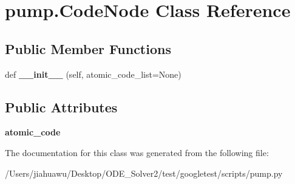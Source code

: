 \hypertarget{classpump_1_1_code_node}{}\section{pump.\+Code\+Node Class Reference}
\label{classpump_1_1_code_node}
\subsection*{Public Member Functions}
\begin{DoxyCompactItemize}
\item 
\mbox{\label{classpump_1_1_code_node_a2ca8a75324a64e48004812d6c0bc1cbd}} 
def {\bfseries \+\_\+\+\_\+init\+\_\+\+\_\+} (self, atomic\+\_\+code\+\_\+list=None)
\end{DoxyCompactItemize}
\subsection*{Public Attributes}
\begin{DoxyCompactItemize}
\item 
\mbox{\label{classpump_1_1_code_node_ac7251110cc987c709e0e17d95521993e}} 
{\bfseries atomic\+\_\+code}
\end{DoxyCompactItemize}


The documentation for this class was generated from the following file\+:\begin{DoxyCompactItemize}
\item 
/\+Users/jiahuawu/\+Desktop/\+O\+D\+E\+\_\+\+Solver2/test/googletest/scripts/pump.\+py\end{DoxyCompactItemize}
